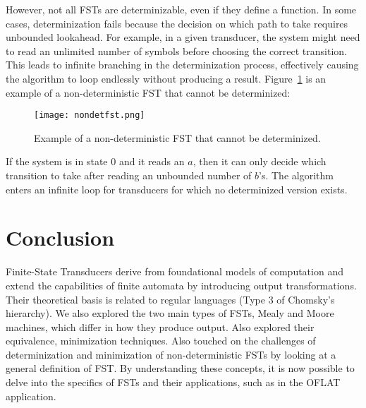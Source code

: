 However, not all FSTs are determinizable, even if they define a function. 
In some cases, determinization fails because the decision on which path to take requires unbounded lookahead. 
For example, in a given transducer, the system might need to read an unlimited number of symbols before choosing the correct transition. 
This leads to infinite branching in the determinization process, effectively causing the algorithm to loop endlessly without producing a result. 
Figure~\ref{nondetfst} is an example of a non-deterministic FST that cannot be determinized: \cite{vannoord1997fst}

\begin{figure}[htbp]
    \centering
    \texttt{[image: nondetfst.png]}
    \caption{Example of a non-deterministic FST that cannot be determinized.}
    \label{nondetfst}
\end{figure}

If the system is in state $0$ and it reads an $a$, then it can only decide which transition to take after reading an unbounded number of $b$'s. 
The algorithm enters an infinite loop for transducers for which no determinized version exists.


\section{Conclusion}

Finite-State Transducers derive from foundational models of computation and extend the capabilities of finite automata by introducing output transformations. 
Their theoretical basis is related to regular languages (Type 3 of Chomsky's hierarchy). We also explored the two main types of FSTs, Mealy and Moore machines,
which differ in how they produce output. Also explored their equivalence, minimization techniques. Also touched on the challenges of determinization and minimization of non-deterministic FSTs
by looking at a general definition of FST.
By understanding these concepts, it is now possible to delve into the specifics of FSTs and their applications, such as in the OFLAT application.


